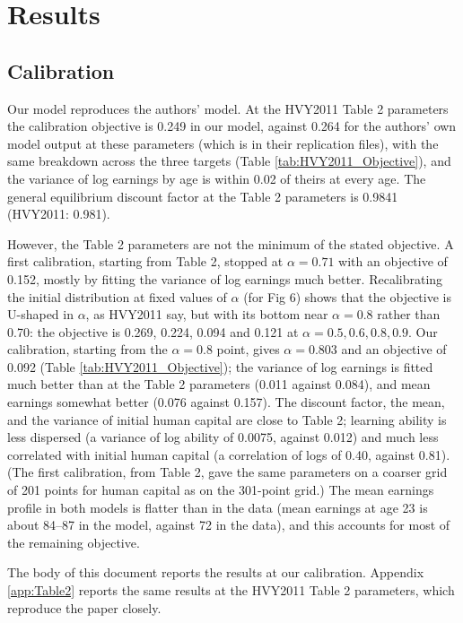 \documentclass[11pt,fleqn]{article}
\begin{document}
\section{Results}

\subsection{Calibration}\label{sec:calibration}

Our model reproduces the authors' model. At the HVY2011 Table 2 parameters the calibration objective is 0.249 in our model, against 0.264 for the authors' own model output at these parameters (which is in their replication files), with the same breakdown across the three targets (Table \ref{tab:HVY2011_Objective}), and the variance of log earnings by age is within 0.02 of theirs at every age. The general equilibrium discount factor at the Table 2 parameters is 0.9841 (HVY2011: 0.981).

However, the Table 2 parameters are not the minimum of the stated objective. A first calibration, starting from Table 2, stopped at $\alpha=0.71$ with an objective of 0.152, mostly by fitting the variance of log earnings much better. Recalibrating the initial distribution at fixed values of $\alpha$ (for Fig 6) shows that the objective is U-shaped in $\alpha$, as HVY2011 say, but with its bottom near $\alpha=0.8$ rather than 0.70: the objective is 0.269, 0.224, 0.094 and 0.121 at $\alpha=0.5,0.6,0.8,0.9$. Our calibration, starting from the $\alpha=0.8$ point, gives $\alpha=0.803$ and an objective of 0.092 (Table \ref{tab:HVY2011_Objective}); the variance of log earnings is fitted much better than at the Table 2 parameters (0.011 against 0.084), and mean earnings somewhat better (0.076 against 0.157). The discount factor, the mean, and the variance of initial human capital are close to Table 2; learning ability is less dispersed (a variance of log ability of 0.0075, against 0.012) and much less correlated with initial human capital (a correlation of logs of 0.40, against 0.81). (The first calibration, from Table 2, gave the same parameters on a coarser grid of 201 points for human capital as on the 301-point grid.) The mean earnings profile in both models is flatter than in the data (mean earnings at age 23 is about 84--87 in the model, against 72 in the data), and this accounts for most of the remaining objective.

The body of this document reports the results at our calibration. Appendix \ref{app:Table2} reports the same results at the HVY2011 Table 2 parameters, which reproduce the paper closely.
\end{document}
